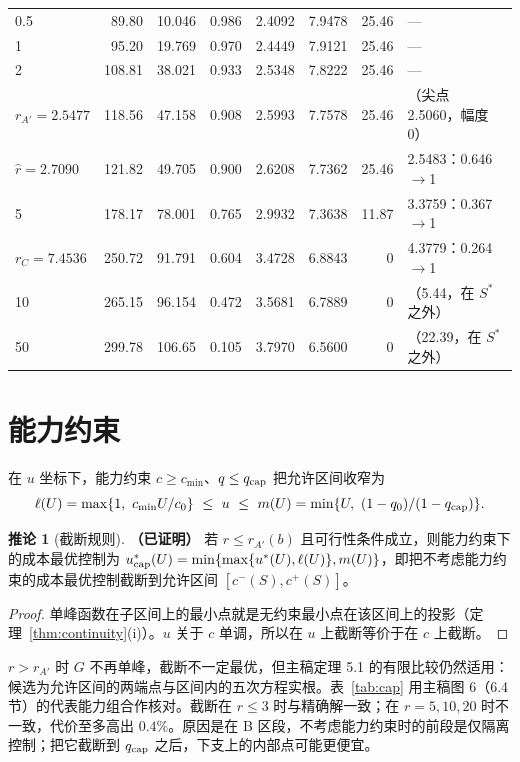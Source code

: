 \documentclass[11pt,a4paper]{ctexart}
\theoremstyle{definition}
\newtheorem{corollary}[theorem]{推论}
\theoremstyle{definition}
\newcommand{\rA}{r_{A'}}
\newcommand{\rhat}{\hat r}
\newcommand{\proven}{\textbf{（已证明）}}
\begin{document}
\begin{table}[htbp]
\begin{tabular}{@{}lrrrrrrl@{}}
0.5 & 89.80 & 10.046 & 0.986 & 2.4092 & 7.9478 & 25.46 & —\\
1 & 95.20 & 19.769 & 0.970 & 2.4449 & 7.9121 & 25.46 & —\\
2 & 108.81 & 38.021 & 0.933 & 2.5348 & 7.8222 & 25.46 & —\\
$\rA=2.5477$ & 118.56 & 47.158 & 0.908 & 2.5993 & 7.7578 & 25.46 & （尖点 2.5060，幅度 0）\\
$\rhat=2.7090$ & 121.82 & 49.705 & 0.900 & 2.6208 & 7.7362 & 25.46 & 2.5483：0.646$\to$1\\
5 & 178.17 & 78.001 & 0.765 & 2.9932 & 7.3638 & 11.87 & 3.3759：0.367$\to$1\\
$r_C=7.4536$ & 250.72 & 91.791 & 0.604 & 3.4728 & 6.8843 & 0 & 4.3779：0.264$\to$1\\
10 & 265.15 & 96.154 & 0.472 & 3.5681 & 6.7889 & 0 & （5.44，在 $S^*$ 之外）\\
50 & 299.78 & 106.65 & 0.105 & 3.7970 & 6.5600 & 0 & （22.39，在 $S^*$ 之外）\\\bottomrule
\end{tabular}
\end{table}

\section{能力约束}
\label{sec:capacity}

在 $u$ 坐标下，能力约束 $c\ge c_{\min}$、$q\le q_{\rm cap}$ 把允许区间收窄为
\[
\ell(U)=\max\{1,\ c_{\min}U/c_0\}\ \le\ u\ \le\ m(U)=\min\{U,\ (1-q_0)/(1-q_{\rm cap})\}.
\]

\begin{corollary}[截断规则]\label{cor:clip}\proven
若 $r\le\rA(b)$ 且可行性条件成立，则能力约束下的成本最优控制为 $u^*_{\rm cap}(U)=\min\{\max\{u^*(U),\ell(U)\},m(U)\}$，即把不考虑能力约束的成本最优控制截断到允许区间 $[c^-(S),c^+(S)]$。
\end{corollary}
\begin{proof}
单峰函数在子区间上的最小点就是无约束最小点在该区间上的投影（定理~\ref{thm:continuity}(i)）。$u$ 关于 $c$ 单调，所以在 $u$ 上截断等价于在 $c$ 上截断。
\end{proof}

$r>\rA$ 时 $G$ 不再单峰，截断不一定最优，但主稿定理 5.1 的有限比较仍然适用：候选为允许区间的两端点与区间内的五次方程实根。表~\ref{tab:cap} 用主稿图 6（6.4 节）的代表能力组合作核对。截断在 $r\le3$ 时与精确解一致；在 $r=5,10,20$ 时不一致，代价至多高出 $0.4\%$。原因是在 B 区段，不考虑能力约束时的前段是仅隔离控制；把它截断到 $q_{\rm cap}$ 之后，下支上的内部点可能更便宜。
\end{document}
